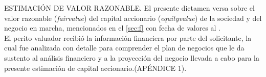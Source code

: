 \textcolor{secundario}{ESTIMACI\'ON DE VALOR RAZONABLE.} El presente dictamen versa sobre el valor razonable (\textit{\gls{fairvalue}}) del capital accionario (\textit{\gls{equityvalue}}) de la sociedad \empresaSolicitante y del negocio en marcha, mencionados en el \autoref{sec:f} con fecha de valores al \fechaValores.\\[10pt]

El perito valuador recibi\'o la informaci\'on financiera por parte del solicitante, la cual fue analizada con detalle para comprender el plan de negocios que le da sustento al an\'alisis financiero y a la proyecci\'on del negocio llevada a cabo para la presente estimaci\'on de capital accionario.(\textcolor{secundario}{AP\'ENDICE 1}).\\

